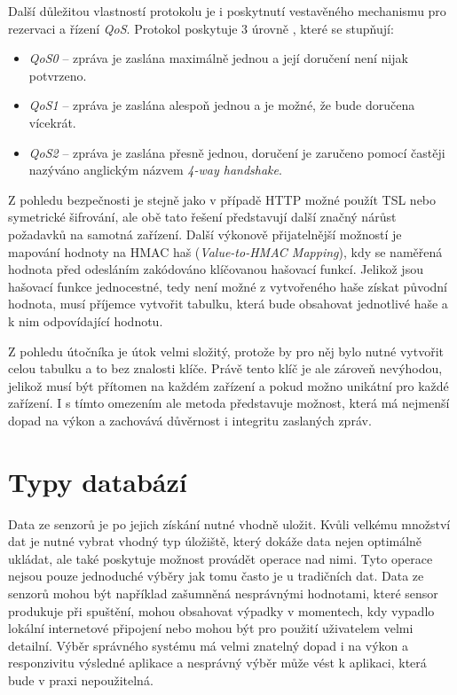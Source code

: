 Další důležitou vlastností protokolu je i poskytnutí vestavěného mechanismu pro rezervaci a řízení \textit{QoS}. Protokol poskytuje 3 úrovně \cite{soni2017survey}, které se stupňují:
\begin{itemize}
\item \textit{QoS0} -- zpráva je zaslána maximálně jednou a její doručení není nijak potvrzeno.
\item \textit{QoS1} -- zpráva je zaslána alespoň jednou a je možné, že bude doručena vícekrát.
\item \textit{QoS2} -- zpráva je zaslána přesně jednou, doručení je zaručeno pomocí  častěji nazýváno anglickým názvem \textit{4-way handshake}.
\end{itemize}

Z pohledu bezpečnosti je stejně jako v případě HTTP možné použít TSL nebo symetrické šifrování, ale obě tato řešení představují další značný nárůst požadavků \cite{dinculeanua2019vulnerabilities} na samotná zařízení. Další výkonově přijatelnější možností je mapování hodnoty na HMAC haš (\textit{Value-to-HMAC Mapping}), kdy se naměřená hodnota před odesláním zakódováno klíčovanou hašovací funkcí. Jelikož jsou hašovací funkce jednocestné, tedy není možné z vytvořeného haše získat původní hodnota, musí příjemce vytvořit tabulku, která bude obsahovat jednotlivé haše a k nim odpovídající hodnotu.

Z pohledu útočníka je útok velmi složitý, protože by pro něj bylo nutné vytvořit celou tabulku a to bez znalosti klíče. Právě tento klíč je ale zároveň nevýhodou, jelikož musí být přítomen na každém zařízení a pokud možno unikátní pro každé zařízení. I s tímto omezením ale metoda představuje možnost, která má nejmenší dopad na výkon a zachovává důvěrnost i integritu zaslaných zpráv.

\chapter{Typy databází}
\label{chapter_db}
Data ze senzorů je po jejich získání nutné vhodně uložit. Kvůli velkému množství dat je nutné vybrat vhodný typ úložiště, který dokáže data nejen optimálně ukládat, ale také poskytuje možnost provádět operace nad nimi. Tyto operace nejsou pouze jednoduché výběry jak tomu často je u tradičních dat. Data ze senzorů mohou být například zašumněná nesprávnými hodnotami, které sensor produkuje při spuštění, mohou obsahovat výpadky v momentech, kdy vypadlo lokální internetové připojení nebo mohou být pro použití uživatelem velmi detailní. Výběr správného systému má velmi znatelný dopad i na výkon a responzivitu výsledné aplikace a nesprávný výběr může vést k aplikaci, která bude v praxi nepoužitelná.

